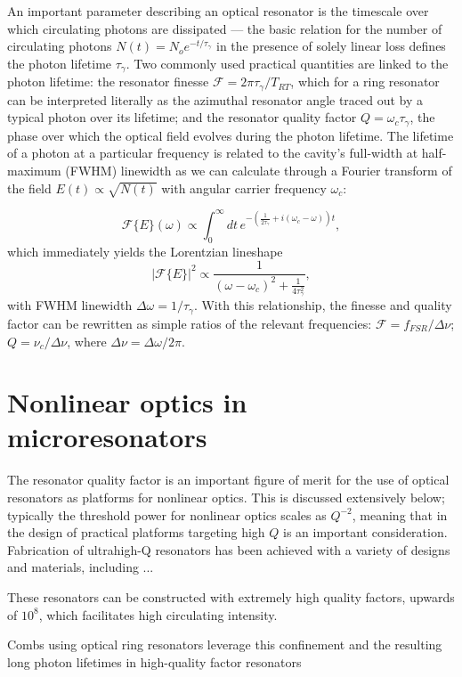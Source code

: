 An important parameter describing an optical resonator is the timescale over which circulating photons are dissipated --- the basic relation for the number of circulating photons $N(t)=N_oe^{-t/\tau_\gamma}$ in the presence of solely linear loss defines the photon lifetime $\tau_\gamma$. Two commonly used practical quantities are linked to the photon lifetime: the resonator finesse $\mathcal{F}=2\pi\tau_\gamma/T_{RT}$, which for a ring resonator can be interpreted literally as the azimuthal resonator angle traced out by a typical photon over its lifetime; and the resonator quality factor $Q=\omega_c \tau_\gamma$, the phase over which the optical field evolves during the photon lifetime. The lifetime of a photon at a particular frequency is related to the cavity's full-width at half-maximum (FWHM) linewidth as we can calculate through a Fourier transform of the field $E(t)\propto\sqrt{N(t)}$ with angular carrier frequency $\omega_c$:

\begin{equation}
\mathcal{F}\{E\}(\omega)\propto\int_0^\infty dt\, e^{-\left(\frac{1}{2\tau_\gamma}+i(\omega_c-\omega)\right)t},
\end{equation}
which immediately yields the Lorentzian lineshape
\begin{equation}
|\mathcal{F}\{E\}|^2\propto\frac{1}{(\omega-\omega_c)^2+\frac{1}{4\tau_\gamma^2}},
\end{equation}
with FWHM linewidth $\Delta\omega=1/\tau_\gamma$. With this relationship, the finesse and quality factor can be rewritten as simple ratios of the relevant frequencies: $\mathcal{F}=f_{FSR}/\Delta\nu$; $Q=\nu_c/\Delta\nu$, where $\Delta\nu=\Delta\omega/2\pi$.





\section{Nonlinear optics in microresonators}

The resonator quality factor is an important figure of merit for the use of optical resonators as platforms for nonlinear optics. This is discussed extensively below; typically the threshold power for nonlinear optics scales as $Q^{-2}$, meaning that in the design of practical platforms targeting high $Q$ is an important consideration. Fabrication of ultrahigh-Q resonators has been achieved with a variety of designs and materials, including ... 


 These resonators can be constructed with extremely high quality factors, upwards of $10^8$, which facilitates high circulating intensity. 
 
 Combs using optical ring resonators leverage this confinement and the resulting long photon lifetimes in high-quality factor resonators 